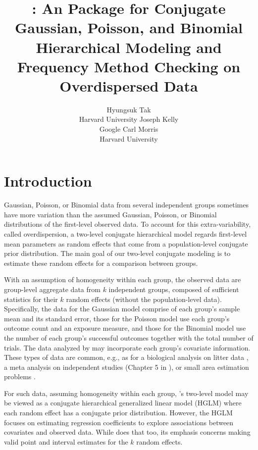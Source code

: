 \documentclass[article]{jss}
\author{Hyungsuk Tak\\Harvard University \And 
             Joseph Kelly\\Google\And
             Carl Morris\\ Harvard University}
\title{\pkg{Rgbp}: An \proglang{R} Package for Conjugate Gaussian, Poisson, and Binomial Hierarchical Modeling and Frequency Method Checking on Overdispersed Data}
\begin{document}

\section[Introduction]{Introduction}
Gaussian, Poisson, or Binomial data from several independent groups sometimes have more variation than the assumed Gaussian, Poisson, or Binomial distributions of the first-level observed data. To account for this extra-variability, called overdispersion, a  two-level conjugate hierarchical model regards first-level mean parameters as random effects that come from a population-level conjugate prior distribution. The main  goal of our two-level conjugate modeling is to estimate these random effects for a comparison between groups.



With an assumption of homogeneity within each group, the observed data are group-level aggregate data from $k$ independent  groups, composed of sufficient statistics for their $k$ random effects (without the population-level data). Specifically, the data for the Gaussian model comprise of each group's sample mean and its standard error, those for the Poisson model use each group's outcome count and an exposure measure, and those for the Binomial model use the number of each group's  successful outcomes together with the total number of trials. The data analyzed by  may incorporate each group's covariate information. These types of  data are common, e.g., as for a biological analysis on litter data \citep{tamura1987stabilized}, a meta analysis on independent studies (Chapter 5 in \cite{gelman2014bayesian}), or small area estimation problems \citep{ghosh1994small, rao2003small}.  

For such data, assuming homogeneity within each group, 's two-level model may be viewed as a conjugate hierarchical generalized linear model (HGLM) \citep{lee1996hierarchical, hglm2006} where each random effect has a conjugate prior distribution.    However, the HGLM focuses on estimating regression coefficients to explore associations between covariates and observed data.   While  does that too, its emphasis concerns making valid point and interval estimates for the $k$ random effects.
\end{document}
